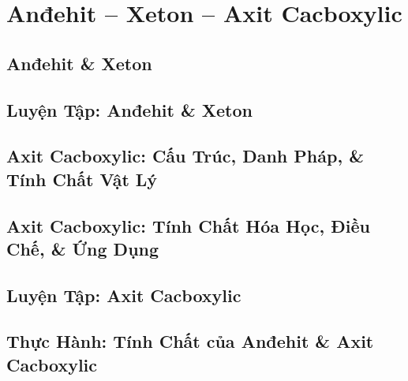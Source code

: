 \documentclass[oneside]{book}
\numberwithin{equation}{section}
\begin{document}

\chapter{Anđehit -- Xeton -- Axit Cacboxylic}

\section{Anđehit \& Xeton}


\section{Luyện Tập: Anđehit \& Xeton}


\section{Axit Cacboxylic: Cấu Trúc, Danh Pháp, \& Tính Chất Vật Lý}


\section{Axit Cacboxylic: Tính Chất Hóa Học, Điều Chế, \& Ứng Dụng}


\section{Luyện Tập: Axit Cacboxylic}


\section{Thực Hành: Tính Chất của Anđehit \& Axit Cacboxylic}


\printbibliography[heading=bibintoc]
	
\end{document}
